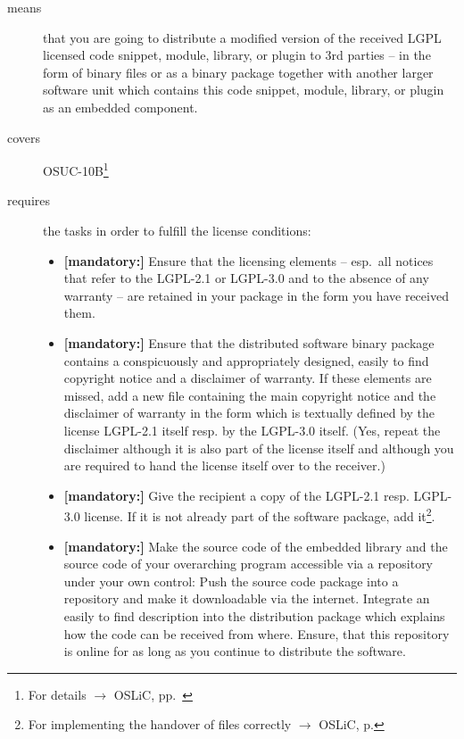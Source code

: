 \begin{description}
\item[means] that you are going to distribute a modified version of the received
LGPL licensed code snippet, module, library, or plugin to 3rd parties -- in the
form of binary files or as a binary package together with another larger
software unit which contains this code snippet, module, library, or plugin as an
embedded
component.
\item[covers] OSUC-10B\footnote{For details $\rightarrow$ OSLiC, pp.\
\pageref{OSUC-10B-DEF}}
\item[requires] the tasks in order to fulfill the license conditions:
\begin{itemize}

  \item \textbf{[mandatory:]} Ensure that the licensing elements -- esp.\ all
  notices that refer to the LGPL-2.1 or LGPL-3.0 and to the absence of any
  warranty -- are retained in your package in the form you have received them.

  \item \textbf{[mandatory:]} Ensure that the distributed software binary
  package contains a conspicuously and appropriately designed, easily to find
  copyright notice and a disclaimer of warranty. If these elements are missed,
  add a new file containing the main copyright notice and the disclaimer of
  warranty in the form which is textually defined by the license LGPL-2.1 itself
  resp. by the LGPL-3.0 itself. (Yes, repeat the disclaimer although it is also
  part of the license itself and although you are required to hand the license
  itself over to the receiver.)
  
  \item \textbf{[mandatory:]} Give the recipient a copy of the LGPL-2.1 resp.
  LGPL-3.0 license. If it is not already part of the software package, add
  it\footnote{For implementing the handover of files correctly $\rightarrow$
  OSLiC, p. \pageref{DistributingFilesHint}}.

  \item \textbf{[mandatory:]} Make the source code of the embedded library and
  the source code of your overarching program accessible via a repository under
  your own control: Push the source code package into a repository and make it
  downloadable via the internet. Integrate an easily to find description into
  the distribution package which explains how the code can be received from
  where. Ensure, that this repository is online for as long as you continue to
  distribute the software.


\end{itemize}
\end{description}
